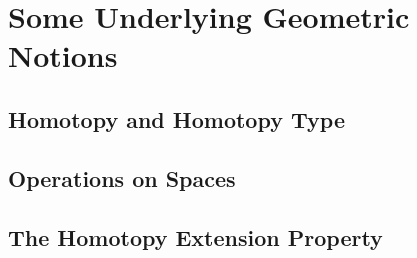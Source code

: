 \chapter{Some Underlying Geometric Notions}

\section{Homotopy and Homotopy Type}
\section{Operations on Spaces}
\section{The Homotopy Extension Property}

